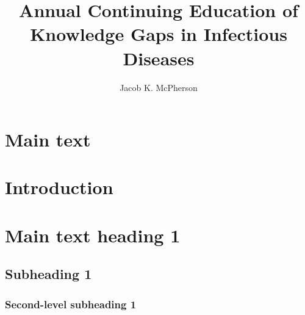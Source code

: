 \documentclass[fleqn,10pt]{wlscirep}
\title{Annual Continuing Education of Knowledge Gaps in Infectious Diseases}
\author[1,*]{Jacob K. McPherson}
\affil[*]{e-mail: jacob@jacobkmcpherson.com}
\begin{document}
\flushbottom
\maketitle

\thispagestyle{empty}

\section*{Main text}




\section*{Introduction}
\lipsum[1] %


\section*{Main text heading 1}


\subsection*{Subheading 1}


\subsubsection*{Second-level subheading 1}
\end{document}

